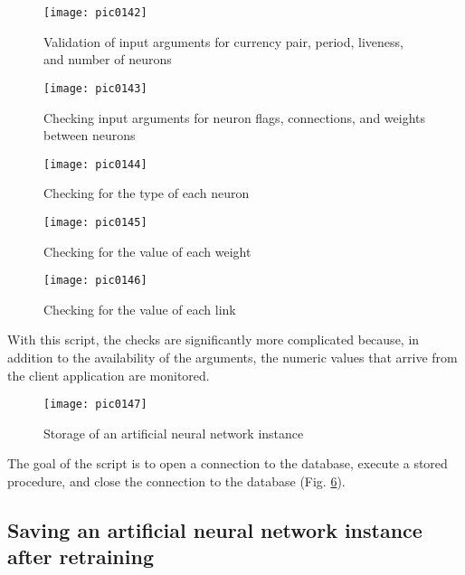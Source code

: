\begin{figure}[h]
\centering
\texttt{[image: pic0142]}
\caption{Validation of input arguments for currency pair, period, liveness, and number of neurons}
\label{fig:pic0142}
\end{figure}
\FloatBarrier

\begin{figure}[h]
\centering
\texttt{[image: pic0143]}
\caption{Checking input arguments for neuron flags, connections, and weights between neurons}
\label{fig:pic0143}
\end{figure}
\FloatBarrier

\begin{figure}[h]
\centering
\texttt{[image: pic0144]}
\caption{Checking for the type of each neuron}
\label{fig:pic0144}
\end{figure}
\FloatBarrier

\begin{figure}[h]
\centering
\texttt{[image: pic0145]}
\caption{Checking for the value of each weight}
\label{fig:pic0145}
\end{figure}
\FloatBarrier

\begin{figure}[h]
\centering
\texttt{[image: pic0146]}
\caption{Checking for the value of each link}
\label{fig:pic0146}
\end{figure}
\FloatBarrier

With this script, the checks are significantly more complicated because, in addition to the availability of the arguments, the numeric values that arrive from the client application are monitored.

\begin{figure}[h]
\centering
\texttt{[image: pic0147]}
\caption{Storage of an artificial neural network instance}
\label{fig:pic0147}
\end{figure}
\FloatBarrier

The goal of the script is to open a connection to the database, execute a stored procedure, and close the connection to the database (Fig. \ref{fig:pic0147}).

\subsection{Saving an artificial neural network instance after retraining}


